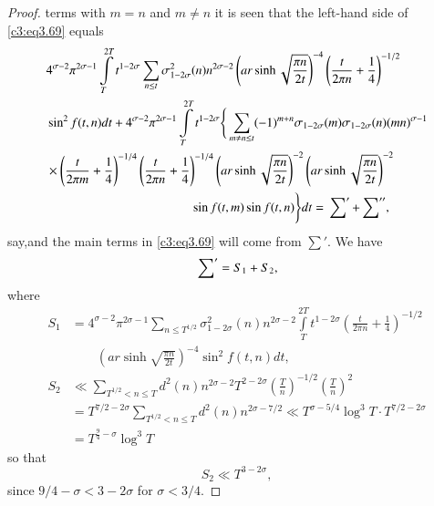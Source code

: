 \begin{proof}
  terms with $m=n$ and $m \neq n$ it is seen that the left-hand side
  of \eqref{c3:eq3.69} equals
  {\fontsize{10}{12}\selectfont
  \begin{align*}
    & 4^{\sigma-2} \pi^{2 \sigma-1} \int\limits_T^{2T} t^{1- 2 \sigma}
    \sum_{n \leq t} \sigma^2_{1- 2 \sigma} (n) n^{2 \sigma-2} \left(ar
    \sinh \sqrt{\frac{\pi n}{2t}}\right)^{-4} \left(\frac{t}{2 \pi n}
    + \frac{1}{4} \right)^{-1/2}\\ 
    & \sin^2 f(t, n) dt
    + 4^{\sigma-2} \pi^{2 \sigma-1} \int\limits_T^{2T} t^{1- 2\sigma}
    \Bigg\{ \sum_{m \neq n \leq t} (-1)^{m+n}\sigma_{1-2 \sigma}(m)
    \sigma_{1-2\sigma} (n) (mn)^{\sigma-1}\\
    &\times \left(\frac{t}{2 \pi m} + \frac{1}{4} \right)^{-1/4}
    \left(\frac{t}{2 \pi n} + \frac{1}{4} \right)^{-1/4} \left(ar
    \sinh \sqrt{\frac{\pi n}{2t}} \right)^{-2} \left(ar \sinh
    \sqrt{\frac{\pi n}{2t}} \right)^{-2}\\ 
    & \hspace{4cm}\sin f(t, m) \sin f(t, n)\Bigg\} dt
     = \sideset{}{'}\sum + \sideset{}{''}\sum,
  \end{align*}}
  say,\pageoriginale and the main terms in \eqref{c3:eq3.69} will come
  from $\sum'$. We have
  $$
  \sideset{}{'}\sum = S_1 + S_2,
  $$
  where
  \begin{align*}
    S_1 & = 4^{\sigma-2} \pi^{2 \sigma-1} \sum_{n \leq T^{1/2}}
    \sigma^2_{1-2 \sigma} (n) n^{2\sigma-2} \int\limits_T^{2T}
    t^{1-2\sigma} \left( \frac{t}{2 \pi n} + \frac{1}{4}
    \right)^{-1/2}\\ 
    & \qquad\left( ar \sinh \sqrt{\frac{\pi n}{2t}} \right)^{-4}
    \sin^2 f(t, n)dt,\\
    S_2 & \ll \sum_{T^{1/2} < n \leq T} d^2 (n) n^{2 \sigma-2} T^{2-
      2\sigma} \left( \frac{T}{n}\right)^{-1/2} \left(\frac{T}{n}
    \right)^2\\
    & = T^{7/2-2\sigma} \sum_{T^{1/2} < n \leq T} d^2 (n) n^{2
      \sigma-7/2} \ll T^{\sigma - 5/4} \log ^3 T \cdot
    T^{7/2-2\sigma}\\
    & = T^{\frac{9}{4} -\sigma} \log^3 T
  \end{align*}
  so that
  $$
  S_2 \ll T^{3-2\sigma},
  $$
  since $9/4- \sigma < 3-2 \sigma$ for $\sigma < 3/4$.



\end{proof}
